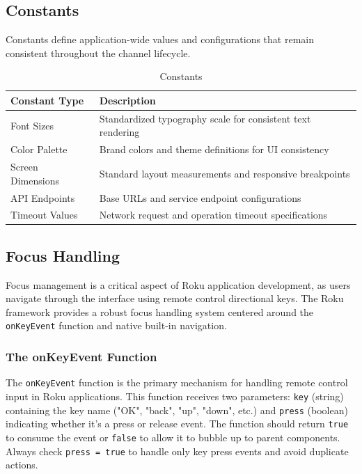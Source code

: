 \documentclass[11pt,letterpaper]{article}
\begin{document}
\subsection{Constants}
\label{sec:constants}

Constants define application-wide values and configurations that remain consistent throughout the channel lifecycle.

\begin{table}[H]
\centering
\scriptsize
\begin{tabular}{@{}p{}p{}@{}}
\toprule
\textbf{Constant Type} & \textbf{Description} \\
\midrule
Font Sizes & Standardized typography scale for consistent text rendering \\
Color Palette & Brand colors and theme definitions for UI consistency \\
Screen Dimensions & Standard layout measurements and responsive breakpoints \\
API Endpoints & Base URLs and service endpoint configurations \\
Timeout Values & Network request and operation timeout specifications \\
\bottomrule
\end{tabular}
\caption{\small Constants}
\label{tab:constants}
\end{table}

\subsection{Focus Handling}
\label{sec:focus-handling}

Focus management is a critical aspect of Roku application development, as users navigate through the interface using remote control directional keys. The Roku framework provides a robust focus handling system centered around the \texttt{onKeyEvent} function and native built-in navigation.

\subsubsection{The onKeyEvent Function}
\label{sec:onkeyevent}

The \texttt{onKeyEvent} function is the primary mechanism for handling remote control input in Roku applications. This function receives two parameters: \texttt{key} (string) containing the key name ("OK", "back", "up", "down", etc.) and \texttt{press} (boolean) indicating whether it's a press or release event. The function should return \texttt{true} to consume the event or \texttt{false} to allow it to bubble up to parent components. Always check \texttt{press = true} to handle only key press events and avoid duplicate actions.
\end{document}
